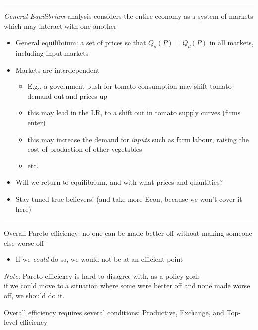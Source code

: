 \documentclass[]{article}
\providecommand{\tightlist}{%
  \setlength{\itemsep}{0pt}\setlength{\parskip}{0pt}}
\begin{document}
\begin{center}\rule{0.5\linewidth}{\linethickness}\end{center}

\emph{General Equilibrium} analysis considers the entire economy as a system of markets which may interact with one another

\begin{itemize}
\tightlist
\item
  General equilibrium: a set of prices so that \(Q_s(P)=Q_d(P)\) in all markets, including input markets
\item
  Markets are interdependent

  \begin{itemize}
  \tightlist
  \item
    E.g., a government push for tomato consumption may shift tomato demand out and prices up
  \item
    this may lead in the LR, to a shift out in tomato supply curves (firms enter)
  \item
    this may increase the demand for \emph{inputs} such as farm labour, raising the cost of production of other vegetables
  \item
    etc.
  \end{itemize}
\item
  Will we return to equilibrium, and with what prices and quantities?
\item
  Stay tuned true believers! (and take more Econ, because we won't cover it here)
\end{itemize}

\begin{center}\rule{0.5\linewidth}{\linethickness}\end{center}

Overall Pareto efficiency: no one can be made better off without making someone else worse off

\begin{itemize}
\tightlist
\item
  If we \emph{could} do so, we would not be at an efficient point
\end{itemize}

\emph{Note:}
Pareto efficiency is hard to disagree with, as a policy goal;\\
if we could move to a situation where some were better off and none made worse off, we should do it.

Overall efficiency requires several conditions: Productive, Exchange, and Top-level efficiency
\end{document}
